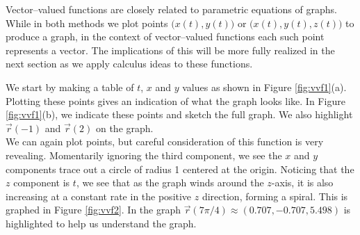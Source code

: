 \enlargethispage{4\baselineskip}
Vector--valued functions are closely related to parametric equations of graphs. While in both methods we plot points $\big(x(t), y(t)\big)$ or $\big(x(t),y(t),z(t)\big)$ to produce a graph, in the context of vector--valued functions each such point represents a vector. The implications of this will be more fully realized in the next section as we apply calculus ideas to these functions.\\

\pagebreak

{We start by making a table of $t$, $x$ and $y$ values as shown in Figure \ref{fig:vvf1}(a). Plotting these points gives an indication of what the graph looks like. In Figure \ref{fig:vvf1}(b), we indicate these points and sketch the full graph. We also highlight $\vec r(-1)$ and $\vec r(2)$ on the graph.
}\\

{We can again plot points, but careful consideration of this function is very revealing. Momentarily ignoring the third component, we see the $x$ and $y$ components trace out a circle of radius 1 centered at the origin. Noticing that the $z$ component is $t$, we see that as the graph winds around the $z$-axis, it is also increasing at a constant rate in the positive $z$ direction, forming a spiral. This is graphed in Figure \ref{fig:vvf2}. In the graph $\vec r(7\pi/4)\approx (0.707,-0.707,5.498) $ is highlighted to help us understand the graph.
}\\

